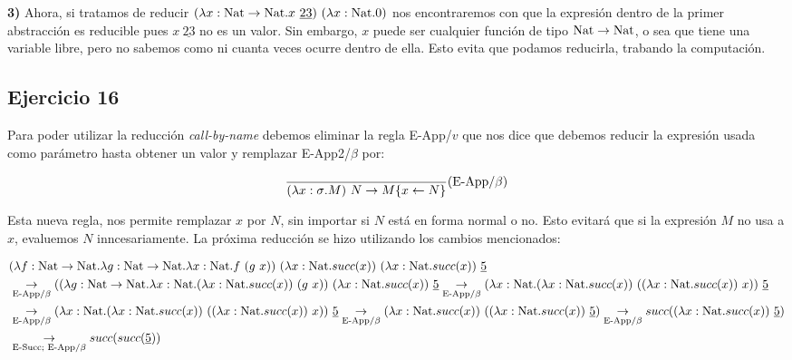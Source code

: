 \documentclass[10pt,a4paper, landscape]{article}
\begin{document}
\begin{multicols}{2}
\textbf{3)} Ahora, si tratamos de reducir $(\lambda x: \text{Nat}\to\text{Nat} \text{.} x~\underline{23})~(\lambda x: \text{Nat} \text{.} 0)$ nos encontraremos con que la expresión dentro de la primer abstracción es reducible pues $x~\underline{23}$ no es un valor. Sin embargo,  $x$ puede ser cualquier función de tipo  $\text{Nat}\to\text{Nat}$, o sea que tiene una variable libre, pero no sabemos como ni cuanta veces ocurre dentro de ella. Esto evita que podamos reducirla, trabando la computación.
\end{multicols}


\newpage

\subsection{Ejercicio 16}
\begin{multicols}{2}
Para poder utilizar la reducción \textit{call-by-name} debemos eliminar la regla E-App/$v$ que nos dice que debemos reducir la expresión usada como parámetro hasta obtener un valor y remplazar E-App2/$\beta$ por:
\vfil

$$\frac{}{(\lambda x: \sigma \text{.} M)~N \to M\{x\leftarrow N\}}(\text{E-App/}\beta)$$

Esta nueva regla, nos permite remplazar $x$ por $N$, sin importar si $N$ está en forma normal o no. Esto evitará que si la expresión $M$ no usa a $x$, evaluemos $N$ inncesariamente. La próxima reducción se hizo utilizando los cambios mencionados:
\end{multicols}

\begin{equation*}
\begin{split}
&(\lambda f: \text{Nat}\to\text{Nat} \text{.} \lambda g: \text{Nat}\to\text{Nat} \text{.} \lambda x: \text{Nat} \text{.} f~(g~x))~(\lambda x: \text{Nat} \text{.} succ(x))~(\lambda x: \text{Nat} \text{.} succ(x))~\underline{5} \\
    &\underset{\text{E-App}/\beta}{\to} ((\lambda g: \text{Nat}\to\text{Nat} \text{.} \lambda x: \text{Nat} \text{.} (\lambda x: \text{Nat} \text{.} succ(x))~(g~x))~(\lambda x: \text{Nat} \text{.} succ(x))~\underline{5}
\underset{\text{E-App}/\beta}{\to} (\lambda x: \text{Nat} \text{.} (\lambda x: \text{Nat} \text{.} succ(x))~((\lambda x: \text{Nat} \text{.} succ(x))~x))~\underline{5}\\
&\underset{\text{E-App}/\beta}{\to} (\lambda x: \text{Nat} \text{.} (\lambda x: \text{Nat} \text{.} succ(x))~((\lambda x: \text{Nat} \text{.} succ(x))~x))~\underline{5} 
\underset{\text{E-App}/\beta}{\to} (\lambda x: \text{Nat} \text{.} succ(x))~((\lambda x: \text{Nat} \text{.} succ(x))~\underline{5})
\underset{\text{E-App}/\beta}{\to} succ((\lambda x: \text{Nat} \text{.} succ(x))~\underline{5}) \\
&\underset{\text{E-Succ; E-App}/\beta}{\to} succ(succ(\underline{5})) 
\end{split}
\end{equation*}
\end{document}
